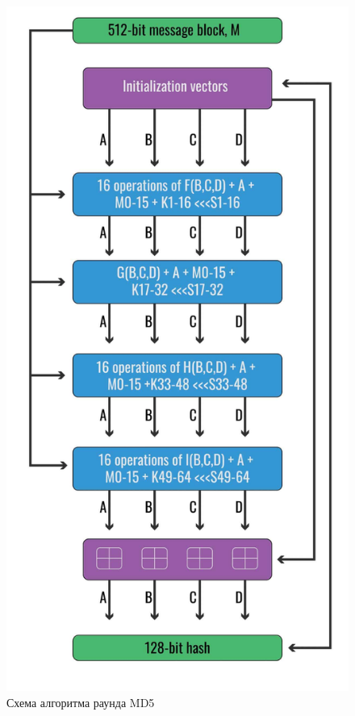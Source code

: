 \begin{figure}[ht!]
	\centering
	\includegraphics[width=0.6\linewidth]{img/md5-2.jpg}
	\caption{Схема алгоритма раунда MD5}
	\label{img:md5-2}
\end{figure}
